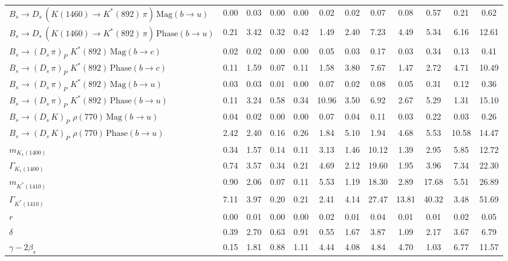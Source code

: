 \begin{tabular}{l  c  c  c  c  c  c  c  c  c  c  | c }
$B_s \to D_s \, ( K(1460) \to K^{*}(892) \, \pi ) \, \text{Mag} (b \to u)$ & 0.00 & 0.03 & 0.00 & 0.00 & 0.02 & 0.02 & 0.07 & 0.08 & 0.57 & 0.21 & 0.62 \\ 
$B_s \to D_s \, ( K(1460) \to K^{*}(892) \, \pi ) \, \text{Phase} (b \to u)$ & 0.21 & 3.42 & 0.32 & 0.42 & 1.49 & 2.40 & 7.23 & 4.49 & 5.34 & 6.16 & 12.61 \\ 
$B_s \to ( D_s \, \pi)_{P} \, \, K^{*}(892) \, \text{Mag} (b \to c)$ & 0.02 & 0.02 & 0.00 & 0.00 & 0.05 & 0.03 & 0.17 & 0.03 & 0.34 & 0.13 & 0.41 \\ 
$B_s \to ( D_s \, \pi)_{P} \, \, K^{*}(892) \, \text{Phase} (b \to c)$ & 0.11 & 1.59 & 0.07 & 0.11 & 1.58 & 3.80 & 7.67 & 1.47 & 2.72 & 4.71 & 10.49 \\ 
$B_s \to ( D_s \, \pi)_{P} \, \, K^{*}(892) \, \text{Mag} (b \to u)$ & 0.03 & 0.03 & 0.01 & 0.00 & 0.07 & 0.02 & 0.08 & 0.05 & 0.31 & 0.12 & 0.36 \\ 
$B_s \to ( D_s \, \pi)_{P} \, \, K^{*}(892) \, \text{Phase} (b \to u)$ & 0.11 & 3.24 & 0.58 & 0.34 & 10.96 & 3.50 & 6.92 & 2.67 & 5.29 & 1.31 & 15.10 \\ 
$B_s \to ( D_s \, K)_{P} \, \, \rho(770) \, \text{Mag} (b \to u)$ & 0.04 & 0.02 & 0.00 & 0.00 & 0.07 & 0.04 & 0.11 & 0.03 & 0.22 & 0.03 & 0.26 \\ 
$B_s \to ( D_s \, K)_{P} \, \, \rho(770) \, \text{Phase} (b \to u)$ & 2.42 & 2.40 & 0.16 & 0.26 & 1.84 & 5.10 & 1.94 & 4.68 & 5.53 & 10.58 & 14.47 \\ 
$m_{K_1(1400)} $ & 0.34 & 1.57 & 0.14 & 0.11 & 3.13 & 1.46 & 10.12 & 1.39 & 2.95 & 5.85 & 12.72 \\ 
$\Gamma_{K_1(1400)}$ & 0.74 & 3.57 & 0.34 & 0.21 & 4.69 & 2.12 & 19.60 & 1.95 & 3.96 & 7.34 & 22.30 \\ 
$m_{K^{*}(1410)}$ & 0.90 & 2.06 & 0.07 & 0.11 & 5.53 & 1.19 & 18.30 & 2.89 & 17.68 & 5.51 & 26.89 \\ 
$\Gamma_{K^{*}(1410)}$ & 7.11 & 3.97 & 0.20 & 0.21 & 2.41 & 4.14 & 27.47 & 13.81 & 40.32 & 3.48 & 51.69 \\ 
$r$ & 0.00 & 0.01 & 0.00 & 0.00 & 0.02 & 0.01 & 0.04 & 0.01 & 0.01 & 0.02 & 0.05 \\ 
$\delta$ & 0.39 & 2.70 & 0.63 & 0.91 & 0.55 & 1.67 & 3.87 & 1.09 & 2.17 & 3.67 & 6.79 \\ 
$\gamma - 2 \beta_{s}$ & 0.15 & 1.81 & 0.88 & 1.11 & 4.44 & 4.08 & 4.84 & 4.70 & 1.03 & 6.77 & 11.57 \\ 
\hline
\hline
\end{tabular}

